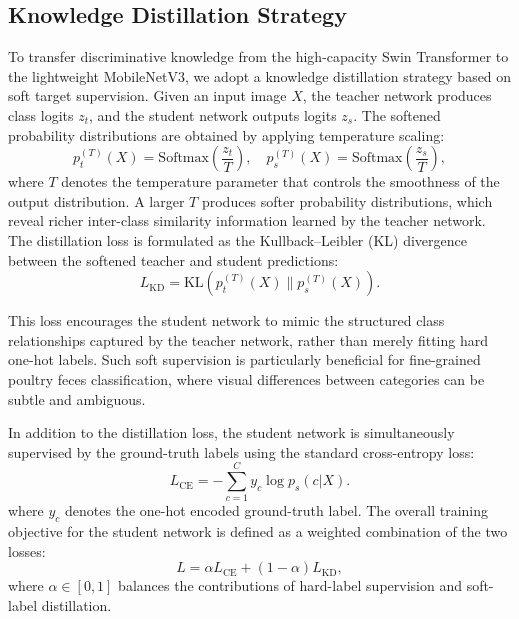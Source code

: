 \documentclass[review]{elsarticle}
\begin{document}
\subsection{Knowledge Distillation Strategy}
To transfer discriminative knowledge from the high-capacity Swin Transformer to the lightweight MobileNetV3, we adopt a knowledge distillation strategy based on soft target supervision. Given an input image $X$, the teacher network produces class logits $z_t$, and the student network outputs logits $z_s$. The softened probability distributions are obtained by applying temperature scaling:
\begin{equation}
p_{t}^{(T)}(X) = \text{Softmax} \left( \frac{z_t}{T} \right), \quad p_{s}^{(T)}(X) = \text{Softmax} \left( \frac{z_s}{T} \right),
\label{eq:soft_outputs}
\end{equation}
where $T$ denotes the temperature parameter that controls the smoothness of the output distribution. A larger $T$ produces softer probability distributions, which reveal richer inter-class similarity information learned by the teacher network.
The distillation loss is formulated as the Kullback–Leibler (KL) divergence between the softened teacher and student predictions:
\begin{equation}
L_{\text{KD}} = \text{KL} \left( p_{t}^{(T)}(X) \| p_{s}^{(T)}(X) \right).
\label{eq:l_kd}
\end{equation}

This loss encourages the student network to mimic the structured class relationships captured by the teacher network, rather than merely fitting hard one-hot labels. Such soft supervision is particularly beneficial for fine-grained poultry feces classification, where visual differences between categories can be subtle and ambiguous.

In addition to the distillation loss, the student network is simultaneously supervised by the ground-truth labels using the standard cross-entropy loss:
\begin{equation}
L_{\text{CE}} = -\sum_{c=1}^{C} y_c \log p_s(c|X).
\label{eq:l_ce}
\end{equation}
where $y_c$ denotes the one-hot encoded ground-truth label. The overall training objective for the student network is defined as a weighted combination of the two losses:
\begin{equation}
L = \alpha L_{\text{CE}} + (1 - \alpha) L_{\text{KD}},
\label{eq:l_total}
\end{equation}
where $\alpha \in[0,1]$ balances the contributions of hard-label supervision and soft-label distillation.
\end{document}
